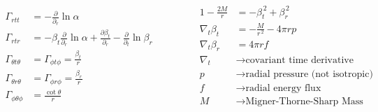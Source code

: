 \documentclass[a4paper, 14pt]{beamer}
\begin{document}
	


\begin{frame}{}
	\[
	\begin{aligned}
		\Gamma_{rtt} &= - \frac{\partial}{\partial_r} \ln \alpha \\
		\Gamma_{rtr} &= - \beta_t \frac{\partial}{\partial_r} \ln \alpha + \frac{\partial \beta_t}{\partial_r} - \frac{\partial}{\partial_t} \ln \beta_r\\
		\Gamma_{\theta t \theta} &= \Gamma_{\phi t \phi} = \frac{\beta_t}{r} \\
		\Gamma_{\theta r \theta} &= \Gamma_{\phi r \phi} = \frac{\beta_r}{r} \\
		\Gamma_{\phi \theta \phi} &= \frac{\cot \theta}{r}
	\end{aligned}\qquad
	\begin{aligned}
		\qquad 1 - \frac{2M}{r} &= - \beta_t^{\, 2} + \beta_r^{\, 2} \\
		\qquad \nabla_t \beta_t &= - \frac{M}{r^{\, 2}} - 4 \pi r p \\
		\qquad \nabla_t \beta_r &= 4 \pi r f \\
		\qquad \nabla_t &\rightarrow \text{covariant time derivative} \\
		\qquad p &\rightarrow \text{radial pressure (not isotropic)} \\
		\qquad f &\rightarrow \text{radial energy flux} \\
		\qquad M &\rightarrow \text{Migner-Thorne-Sharp Mass}
	\end{aligned}
	\]
\end{frame}
\end{document}
